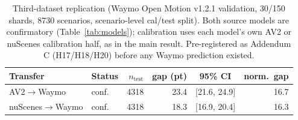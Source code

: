 \begin{table}[t]
\centering
\caption{Third-dataset replication (Waymo Open Motion v1.2.1 validation, 30/150 shards, 8730 scenarios, scenario-level cal/test split). Both source models are confirmatory (Table~\ref{tab:models}); calibration uses each model's own AV2 or nuScenes calibration half, as in the main result. Pre-registered as Addendum C (H17/H18/H20) before any Waymo prediction existed.}
\label{tab:waymo}
\begin{tabular}{llrrcr}
\toprule
Transfer & Status & $n_\text{test}$ & gap (pt) & 95\% CI & norm.\ gap \\
\midrule
AV2$\to$Waymo & conf. & 4318 & 23.4 & [21.6, 24.9] & 16.7 \\
nuScenes$\to$Waymo & conf. & 4318 & 18.3 & [16.9, 20.4] & 16.3 \\
\bottomrule
\end{tabular}
\end{table}
